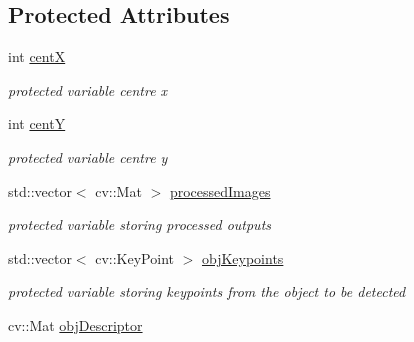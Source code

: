 \subsection*{Protected Attributes}
\begin{DoxyCompactItemize}
\item 
int \hyperlink{class_object_detector_a221c0d1fef75a740dc2657ac8803297f}{centX}\hypertarget{class_object_detector_a221c0d1fef75a740dc2657ac8803297f}{}\label{class_object_detector_a221c0d1fef75a740dc2657ac8803297f}

\begin{DoxyCompactList}\small\item\em protected variable centre x \end{DoxyCompactList}\item 
int \hyperlink{class_object_detector_a90d7e3183d37245a53874abc1a8700b5}{centY}\hypertarget{class_object_detector_a90d7e3183d37245a53874abc1a8700b5}{}\label{class_object_detector_a90d7e3183d37245a53874abc1a8700b5}

\begin{DoxyCompactList}\small\item\em protected variable centre y \end{DoxyCompactList}\item 
std\+::vector$<$ cv\+::\+Mat $>$ \hyperlink{class_object_detector_af1de8ce9d86322d4fe59f3fb07fefee8}{processed\+Images}\hypertarget{class_object_detector_af1de8ce9d86322d4fe59f3fb07fefee8}{}\label{class_object_detector_af1de8ce9d86322d4fe59f3fb07fefee8}

\begin{DoxyCompactList}\small\item\em protected variable storing processed outputs \end{DoxyCompactList}\item 
std\+::vector$<$ cv\+::\+Key\+Point $>$ \hyperlink{class_object_detector_ab7c97164039b016adf7aec44fd42f6fa}{obj\+Keypoints}\hypertarget{class_object_detector_ab7c97164039b016adf7aec44fd42f6fa}{}\label{class_object_detector_ab7c97164039b016adf7aec44fd42f6fa}

\begin{DoxyCompactList}\small\item\em protected variable storing keypoints from the object to be detected \end{DoxyCompactList}\item 
cv\+::\+Mat \hyperlink{class_object_detector_a2fe4da67e069ee00624cd2ba7b5f553c}{obj\+Descriptor}\hypertarget{class_object_detector_a2fe4da67e069ee00624cd2ba7b5f553c}{}\label{class_object_detector_a2fe4da67e069ee00624cd2ba7b5f553c}


\end{DoxyCompactItemize}
